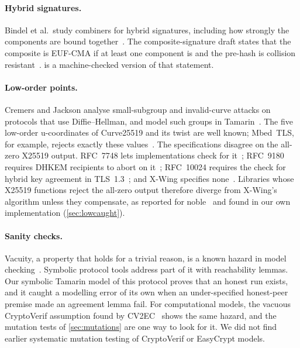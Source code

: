 \paragraph{Hybrid signatures.} Bindel et al.\ study combiners for hybrid
signatures, including how strongly the components are bound
together~\cite{BHMS17}. The composite-signature draft states that the
composite is EUF-CMA if at least one component is and the pre-hash is
collision resistant~\cite[\S1.3]{Composite}.  is a
machine-checked version of that statement.

\paragraph{Low-order points.} Cremers and Jackson analyse small-subgroup and
invalid-curve attacks on protocols that use Diffie--Hellman, and model such
groups in Tamarin~\cite{CJ19}. The five low-order u-coordinates of
Curve25519 and its twist are well known; Mbed~TLS, for example, rejects
exactly these values~\cite{mbedtls}. The specifications disagree on the
all-zero
X25519 output. RFC~7748 lets implementations check for it~\cite{RFC7748};
RFC~9180 requires DHKEM recipients to abort on it~\cite{RFC9180}; RFC~10024
requires the check for hybrid key agreement in TLS~1.3~\cite{RFC10024}; and
X-Wing specifies none~\cite{XWingDraft}. Libraries whose X25519 functions
reject the all-zero output therefore diverge from X-Wing's algorithm unless
they compensate, as reported for noble~\cite{Noble26} and found in our own
implementation (\cref{sec:lowcaught}).

\paragraph{Sanity checks.} Vacuity, a property that holds for a trivial
reason, is a known hazard in model checking~\cite{Kup06}. Symbolic protocol
tools address part of it with reachability lemmas. Our symbolic Tamarin model
of this protocol proves that an honest run exists, and it caught a modelling
error of its own when an under-specified honest-peer premise made an
agreement lemma fail. For computational models, the vacuous CryptoVerif
assumption found by CV2EC~\cite{CV2EC} shows the same hazard, and the
mutation tests of \cref{sec:mutations} are one way to look for it. We did not
find earlier systematic mutation testing of CryptoVerif or EasyCrypt models.
